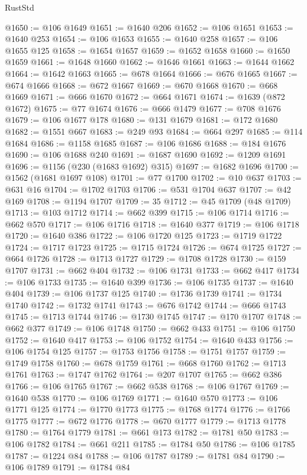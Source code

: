 \begin{lexlean}{RustStd}
\begin{coremodule}
@1650 := @106 @1649
@1651 := @1640 @206
@1652 := @106 @1651
@1653 := @1640 @253
@1654 := @106 @1653
@1655 := @1640 @258
@1657 := @106 @1655 @125
@1658 := @1654 @1657
@1659 := @1652 @1658
@1660 := @1650 @1659
@1661 := @1648 @1660
@1662 := @1646 @1661
@1663 := @1644 @1662
@1664 := @1642 @1663
@1665 := @678 @1664
@1666 := @676 @1665
@1667 := @674 @1666
@1668 := @672 @1667
@1669 := @670 @1668
@1670 := @668 @1669
@1671 := @666 @1670
@1672 := @664 @1671
@1674 := @1639 (@872 @1672)
@1675 := @77 @1674
@1676 := @666 @1479
@1677 := @708 @1676
@1679 := @106 @1677 @178
@1680 := @131 @1679
@1681 := @172 @1680
@1682 := @1551 @667
@1683 := @249 @93
@1684 := @664 @297
@1685 := @114 @1684
@1686 := @1158 @1685
@1687 := @106 @1686
@1688 := @184 @1676
@1690 := @106 @1688 @240
@1691 := @1687 @1690
@1692 := @1209 @1691
@1696 := @1156 (@230 (@1683 @1692) @315)
@1697 := @1682 @1696
@1700 := @1562 (@1681 @1697 @108)
@1701 := @77 @1700
@1702 := @10 @637
@1703 := @631 @16
@1704 := @1702 @1703
@1706 := @531 @1704 @637
@1707 := @42 @169
@1708 := @1194 @1707
@1709 := 35
@1712 := @45 @1709 (@48 @1709)
@1713 := @103 @1712
@1714 := @662 @399
@1715 := @106 @1714
@1716 := @662 @570
@1717 := @106 @1716
@1718 := @1640 @377
@1719 := @106 @1718
@1720 := @1640 @386
@1722 := @106 @1720 @125
@1723 := @1719 @1722
@1724 := @1717 @1723
@1725 := @1715 @1724
@1726 := @674 @1725
@1727 := @664 @1726
@1728 := @1713 @1727
@1729 := @1708 @1728
@1730 := @159 @1707
@1731 := @662 @404
@1732 := @106 @1731
@1733 := @662 @417
@1734 := @106 @1733
@1735 := @1640 @399
@1736 := @106 @1735
@1737 := @1640 @404
@1739 := @106 @1737 @125
@1740 := @1736 @1739
@1741 := @1734 @1740
@1742 := @1732 @1741
@1743 := @676 @1742
@1744 := @666 @1743
@1745 := @1713 @1744
@1746 := @1730 @1745
@1747 := @170 @1707
@1748 := @662 @377
@1749 := @106 @1748
@1750 := @662 @433
@1751 := @106 @1750
@1752 := @1640 @417
@1753 := @106 @1752
@1754 := @1640 @433
@1756 := @106 @1754 @125
@1757 := @1753 @1756
@1758 := @1751 @1757
@1759 := @1749 @1758
@1760 := @678 @1759
@1761 := @668 @1760
@1762 := @1713 @1761
@1763 := @1747 @1762
@1764 := @207 @1707
@1765 := @662 @386
@1766 := @106 @1765
@1767 := @662 @538
@1768 := @106 @1767
@1769 := @1640 @538
@1770 := @106 @1769
@1771 := @1640 @570
@1773 := @106 @1771 @125
@1774 := @1770 @1773
@1775 := @1768 @1774
@1776 := @1766 @1775
@1777 := @672 @1776
@1778 := @670 @1777
@1779 := @1713 @1778
@1780 := @1764 @1779
@1781 := @661 @173
@1782 := @1781 @50
@1783 := @106 @1782
@1784 := @661 @211
@1785 := @1784 @50
@1786 := @106 @1785
@1787 := @1224 @84
@1788 := @106 @1787
@1789 := @1781 @84
@1790 := @106 @1789
@1791 := @1784 @84

\end{coremodule}
\end{lexlean}
